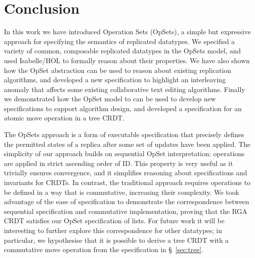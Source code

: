 \documentclass[11pt]{article}
\begin{document}






\section{Conclusion}

In this work we have introduced Operation Sets (OpSets), a simple but expressive approach for specifying the semantics of replicated datatypes.
We specified a variety of common, composable replicated datatypes in the OpSets model, and used Isabelle/HOL to formally reason about their properties.
We have also shown how the OpSet abstraction can be used to reason about existing replication algorithms, and developed a new specification to highlight an interleaving anomaly that affects some existing collaborative text editing algorithms.
Finally we demonstrated how the OpSet model to can be used to develop new specifications to support algorithm design, and developed a specification for an atomic move operation in a tree CRDT.

The OpSets approach is a form of executable specification that precisely defines the permitted states of a replica after some set of updates have been applied.
The simplicity of our approach builds on sequential OpSet interpretation: operations are applied in strict ascending order of ID.
This property is very useful as it trivially ensures convergence, and it simplifies reasoning about specifications and invariants for CRDTs.
In contrast, the traditional approach requires operations to be defined in a way that is commutative, increasing their complexity.
We took advantage of the ease of specification to demonstrate the correspondence between sequential specification and commutative implementation, proving that the RGA CRDT satisfies our OpSet specification of lists.
For future work it will be interesting to further explore this correspondence for other datatypes; in particular, we hypothesise that it is possible to derive a tree CRDT with a commutative move operation from the specification in \S~\ref{sec:tree}.

\end{document}
